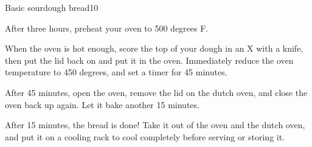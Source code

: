 \documentclass{article}
\begin{document}
\begin{recipe}{Basic sourdough bread}{10}
\begin{step}
      \begin{ingrs}
      \end{ingrs}
      \begin{stepdesc}
        After three hours, preheat your oven to 500 degrees F.
      \end{stepdesc}
    \end{step}
    \begin{step}
      \begin{ingrs}
      \end{ingrs}
      \begin{stepdesc}
        When the oven is hot enough, score the top of your dough in an X with a knife, then put the lid back on and put it in the oven. Immediately reduce the oven temperature to 450 degrees, and set a timer for 45 minutes.
      \end{stepdesc}
    \end{step}
    \begin{step}
      \begin{ingrs}
      \end{ingrs}
      \begin{stepdesc}
        After 45 minutes, open the oven, remove the lid on the dutch oven, and close the oven back up again. Let it bake another 15 minutes.
      \end{stepdesc}
    \end{step}
    \begin{step}
      \begin{ingrs}
      \end{ingrs}
      \begin{stepdesc}
        After 15 minutes, the bread is done! Take it out of the oven and the dutch oven, and put it on a cooling rack to cool completely before serving or storing it.
      \end{stepdesc}
    \end{step}
  \end{recipe}
\end{document}
